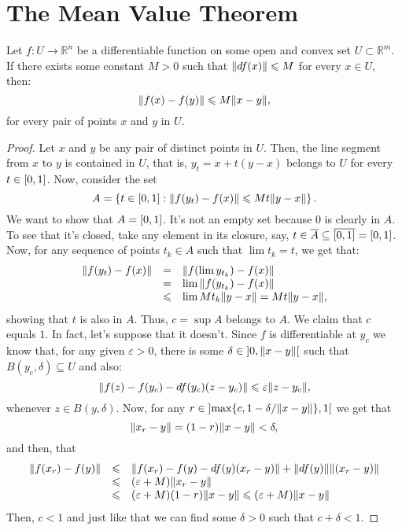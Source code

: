 \section{The Mean Value Theorem}\label{sec:the_mean_value_theorem}

\begin{theorem}\label{thm:the-mean-value-theorem}
	Let \(f:{U}\to{\mathbb{R}^{n}}\) be a differentiable function on some open and
	convex set \({U}\subset{\mathbb{R}^{m}}\). If there exists some constant
	\(M>0\) such that \(\lVert df(x)\rVert\leqslant{M}\) for every \({x}\in{U}\), then:
	\[
		{\lVert f(x)-f(y)\rVert}\leqslant{M\lVert x-y\rVert},
	\]
	for every pair of points \(x\) and \(y\) in \(U\).
\end{theorem}

\begin{proof}
  Let \(x\) and \(y\) be any pair of distinct points in \(U\). Then, the line
  segment from \(x\) to \(y\) is contained in \(U\), that is,
  \(y_{t}=x+t(y-x)\) belongs to \(U\) for every \({t}\in{\interval{0}{1}}\).
  Now, consider the set
  \[
    A
    =
    \left\{
      {t}\in{\interval{0}{1}}
      :
      {\norm{f(y_{t})-f(x)}}\leqslant{Mt\norm{y-x}}
    \right\}
    .
  \]
  We want to show that \(A=\interval{0}{1}\). It's not an empty set because
  \(0\) is clearly in \(A\). To see that it's closed, take any element in its
  closure, say,
  \({t}\in{\overline{A}}\subseteq{\overline{\interval{0}{1}}}=\interval{0}{1}\).
  Now, for any sequence of points \({t_{k}}\in{A}\) such that
  \(\lim{t_{k}}=t\), we get that:
  \[
    \begin{array}{rcl}
      \lVert f(y_{t})-f(x)\rVert
      &=&
      \lVert f(\lim{y_{t_{k}}})-f(x)\rVert
      \\
      &=&
      \lim{\lVert f(y_{t_{k}})-f(x)\rVert}
      \\
      &\leqslant&
      \lim{Mt_{k}\lVert y-x\rVert}=Mt\lVert y-x\rVert,
    \end{array}
  \]
  showing that \(t\) is also in \(A\). Thus, \(c=\sup{A}\) belongs to \(A\). We
  claim that \(c\) equals \(1\). In fact, let's suppose that it doesn't. Since
  \(f\) is differentiable at \(y_{c}\) we know that, for any given
  \(\varepsilon>0\), there is some \({\delta}\in{\ointerval{0}{\norm{x-y}}}\)
  such that \({B(y_{c},\delta)}\subseteq{U}\) and also:
  \[
    \lVert f(z)-f(y_{c})-df(y_{c})(z-y_{c})\rVert
    \leqslant
    \varepsilon\lVert z-y_{c}\rVert,
  \]
  whenever \({z}\in{B(y,\delta)}\). Now, for any
  \({r}\in{\ointerval{\max\{c,1-\delta/\norm{x-y}\}}{1}}\) we get that
  \[
    \lVert x_{r}-y\rVert=(1-r)\lVert x-y\rVert<\delta,
  \]
  and then, that
  \[
    \begin{array}{rcl}
      \lVert f(x_{r})-f(y)\rVert
      &\leqslant&
      \lVert f(x_{r})-f(y)-df(y)(x_{r}-y)\rVert+\lVert df(y)\rVert\lVert(x_{r}-y)\rVert
      \\
      &\leqslant&
      (\varepsilon+M)\lVert x_{r}-y\rVert
      \\
      &\leqslant&
      (\varepsilon+M)(1-r)\lVert x-y\rVert
      \leqslant
      (\varepsilon+M)\lVert x-y\rVert
    \end{array}
  \]
  Then, \(c<1\) and just like that we can find some \(\delta>0\) such that \(c+\delta<1\).
\end{proof}

